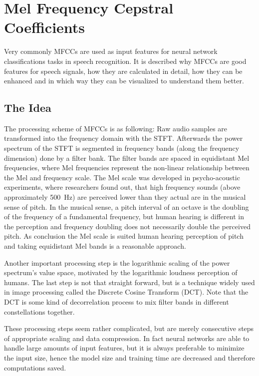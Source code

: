 
\section{Mel Frequency Cepstral Coefficients}\label{sec:signal_mfcc}
\thesisStateRevised
Very commonly MFCCs are used as input features for neural network classifications tasks in speech recognition.
It is described why MFCCs are good features for speech signals, how they are calculated in detail, how they can be enhanced and in which way they can be visualized to understand them better.



\subsection{The Idea}
The processing scheme of MFCCs \cite{Mermelstein1980} is as following:
Raw audio samples are transformed into the frequency domain with the STFT.
Afterwards the power spectrum of the STFT is segmented in frequency bands (along the frequency dimension) done by a filter bank.
The filter bands are spaced in equidistant Mel frequencies, where Mel frequencies represent the non-linear relationship between the Mel and frequency scale.
The Mel scale was developed in psycho-acoustic experiments, where researchers found out, that high frequency sounds (above approximately \SI{500}{\hertz}) are perceived lower than they actual are in the musical sense of pitch.
In the musical sense, a pitch interval of an octave is the doubling of the frequency of a fundamental frequency, but human hearing is different in the perception and frequency doubling does not necessarily double the perceived pitch.
As conclusion the Mel scale is suited human hearing perception of pitch and taking equidistant Mel bands is a reasonable approach.

Another important processing step is the logarithmic scaling of the power spectrum's value space, motivated by the logarithmic loudness perception of humans.
The last step is not that straight forward, but is a technique widely used in image processing called the Discrete Cosine Transform (DCT).
Note that the DCT is some kind of decorrelation process to mix filter bands in different constellations together.

These processing steps seem rather complicated, but are merely consecutive steps of appropriate scaling and data compression.
In fact neural networks are able to handle large amounts of input features, but it is always preferable to minimize the input size, hence the model size and training time are decreased and therefore computations saved.


